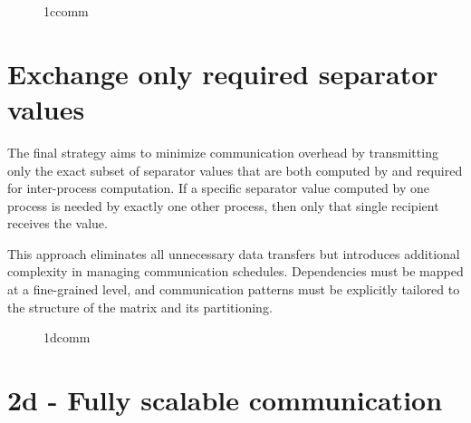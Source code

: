 \begin{figure}[ht]
    \centering
    \caption{1ccomm}
    \label{fig:1ccomm}
\end{figure}

\section{Exchange only required separator values}
The final strategy aims to minimize communication overhead by transmitting only the exact subset of separator values that are both computed by and required for inter-process computation. If a specific separator value computed by one process is needed by exactly one other process, then only that single recipient receives the value.

This approach eliminates all unnecessary data transfers but introduces additional complexity in managing communication schedules. Dependencies must be mapped at a fine-grained level, and communication patterns must be explicitly tailored to the structure of the matrix and its partitioning.



\begin{figure}[ht]
    \centering
    \caption{1dcomm}
    \label{fig:1dcomm}
\end{figure}

\section{2d - Fully scalable communication}
